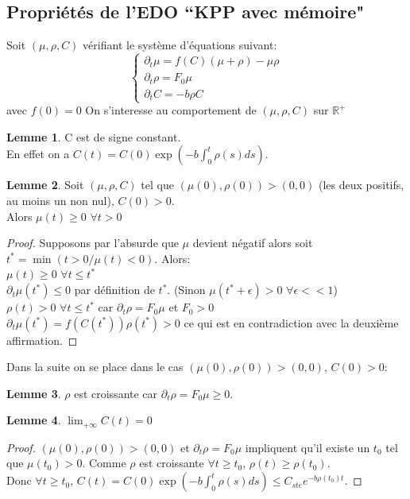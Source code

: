 \documentclass[11pt]{article}
\newcommand{\dt}{\partial_t}
\theoremstyle{definition}
\begin{document}
\fi


\subsection{Propriétés de l'EDO ``KPP avec mémoire"}
\newtheorem{lemma}{Lemme}
Soit $(\mu,\rho,C)$ vérifiant le système d’équations suivant:
\begin{equation} \left\{
                \begin{array}{ll}
                   \dt\mu  = f(C)(\mu + \rho) -\mu\rho\\
                 \dt\rho=  F_0 \mu \\
                  \dt C = -b\rho C
                \end{array}
              \right.
\end{equation} avec $f(0)=0$
On s'interesse au comportement de $(\mu,\rho,C)$ sur $\mathbb{R}^+$
\begin{lemma}C est de signe constant.\\
En effet on a $C(t)= C(0)\exp(-b\int_{0}^{t}\rho(s)ds)$.
\end{lemma}

\begin{lemma}Soit $(\mu,\rho,C)$ tel que $(\mu(0),\rho(0))> (0,0)$ (les deux positifs, au moins un non nul), $C(0)>0$.\\  Alors $\mu(t)\geq 0$ $\forall t>0$
\end{lemma}
\begin{proof}
Supposons par l'absurde que $\mu$ devient négatif alors soit $t^*= \min(t>0/ \mu(t)<0)$. Alors: \\
$\mu(t)\geq 0$ $\forall t \leq t^*$\\
$\dt\mu(t^*) \leq 0$ par définition de $t^*$. (Sinon $\mu(t^*+\epsilon)>0$ $\forall \epsilon <<1$)\\
$\rho(t)>0$ $\forall t\leq t^*$ car $\dt\rho=  F_0 \mu$ et $F_0>0$\\
$\dt\mu(t^*) = f(C(t^*))\rho(t^*) > 0$ ce qui est en contradiction avec la deuxième affirmation.
\end{proof}
Dans la suite on se place dans le cas $(\mu(0),\rho(0))> (0,0)$, $C(0)>0$:
\begin{lemma} $\rho$ est croissante car $\dt\rho=  F_0 \mu \geq 0$. \end{lemma}



\newpage

\begin{lemma}$\lim_{+\infty}C(t) = 0$ \end{lemma}
\begin{proof} $(\mu(0),\rho(0))> (0,0)$ et $\dt\rho=  F_0 \mu$ impliquent qu'il existe un $t_0$ tel que $\mu(t_0)>0$. Comme $\rho$ est croissante $\forall t\geq t_0$, $\rho(t) \geq \rho(t_0)$.\\Donc $\forall t\geq t_0$, $C(t)= C(0)\exp(-b\int_{0}^{t}\rho(s)ds) \leq C_{ste}e^{-b \rho(t_0)t}$.
\end{proof}
\end{document}
